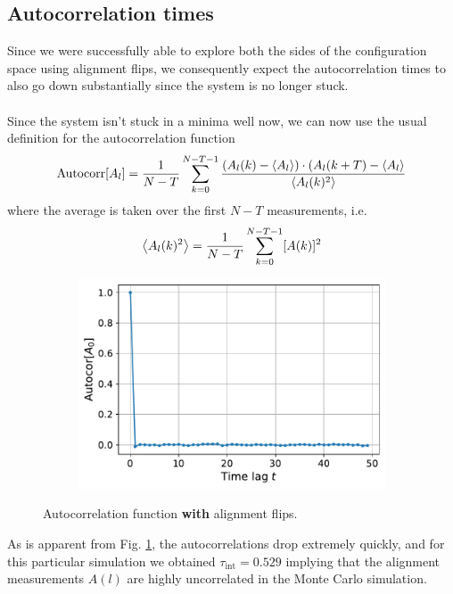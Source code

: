 \documentclass[../thesis_main.tex]{subfiles}
\begin{document}
\subsection{Autocorrelation times}
Since we were successfully able to explore both the sides of the configuration space using alignment flips, we consequently expect the autocorrelation times to also go down substantially since the system is no longer stuck.~\\~\\
Since the system isn't stuck in a minima well now, we can now use the usual definition for the autocorrelation function 
\begin{equation}
    \text{Autocorr}[A_l] = \frac{1}{N-T} \sum_{k=0}^{N-T-1} \frac{(A_l(k) - \expval{A_l}) \cdot (A_l(k+T) - \expval{A_l}}{\expval{A_l(k)^2}}
\end{equation} 
where the average is taken over the first $N-T$ measurements, i.e.
\[
    \expval{A_l(k)^2} = \frac{1}{N-T} \sum_{k=0}^{N-T-1} [A(k)]^2
\] 
\begin{figure}[!htb]
    \centering
    \begin{subfigure}[b]{0.5\textwidth}
        \centering
        \includegraphics[width=\textwidth]{images/fix_subsystem_symmetry/Autocor[A(l)] (l=0).pdf}
    \end{subfigure}
    \caption{Autocorrelation function \textbf{with} alignment flips.}
    \label{alignflipautocorr}
\end{figure}
\FloatBarrier
As is apparent from Fig. \ref{alignflipautocorr}, the autocorrelations drop extremely quickly, and for this particular simulation we obtained $\boxed{\tau_\text{int} = 0.529}$ implying that the alignment measurements $A(l)$ are highly uncorrelated in the Monte Carlo simulation.   
\end{document}
